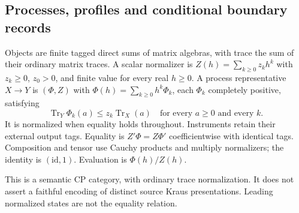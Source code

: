 \subsection{Processes, profiles and conditional boundary records}

\begin{definition}
Objects are finite tagged direct sums of matrix algebras, with trace the
sum of their ordinary matrix traces. A scalar normalizer is
$Z(h)=\sum_{k\geq0}z_kh^k$ with $z_k\geq0$, $z_0>0$, and finite value
for every real $h\geq0$. A process representative $X\to Y$ is
$(\Phi,Z)$ with $\Phi(h)=\sum_{k\geq0}h^k\Phi_k$, each $\Phi_k$ completely
positive, satisfying
\[
 \operatorname{Tr}_Y\Phi_k(a)\leq z_k\operatorname{Tr}_X(a)
 \quad\text{for every }a\geq0\text{ and every }k.
\]
It is normalized when equality holds throughout. Instruments retain their
external output tags. Equality is $Z'\Phi=Z\Phi'$ coefficientwise with
identical tags. Composition and tensor use Cauchy products and multiply
normalizers; the identity is $(\mathrm{id},1)$. Evaluation is $\Phi(h)/Z(h)$.
\end{definition}
\begin{scope}
This is a semantic CP category, with ordinary trace normalization. It does
not assert a faithful encoding of distinct source Kraus presentations.
Leading normalized states are not the equality relation.
\end{scope}

